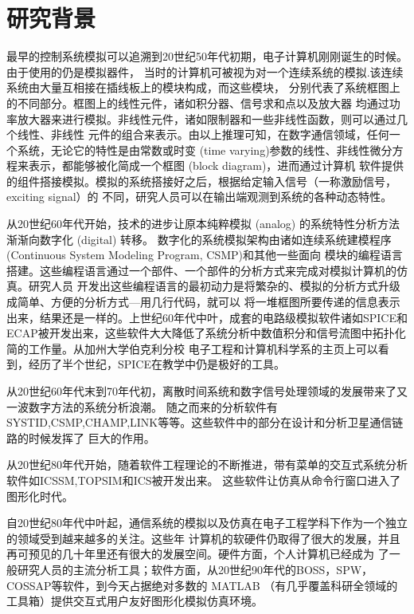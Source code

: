 \section{研究背景}\label{ResearchBackground}
最早的控制系统模拟可以追溯到20世纪50年代初期，电子计算机刚刚诞生的时候。由于使用的仍是模拟器件，
当时的计算机可被视为对一个连续系统的模拟.该连续系统由大量互相接在插线板上的模块构成，而这些模块，
分别代表了系统框图上的不同部分。框图上的线性元件，诸如积分器、信号求和点以及放大器
均通过功率放大器来进行模拟。非线性元件，诸如限制器和一些非线性函数，则可以通过几个线性、非线性
元件的组合来表示。由以上推理可知，在数字通信领域，任何一个系统，无论它的特性是由常数或时变 (time
varying)参数的线性、非线性微分方程来表示，都能够被化简成一个框图 (block diagram)，进而通过计算机
软件提供的组件搭接模拟。模拟的系统搭接好之后，根据给定输入信号（一称激励信号，exciting signal）的
不同，研究人员可以在输出端观测到系统的各种动态特性。
\par
从20世纪60年代开始，技术的进步让原本纯粹模拟 (analog) 的系统特性分析方法渐渐向数字化 (digital) 转移。
数字化的系统模拟架构由诸如连续系统建模程序 (Continuous System Modeling Program, CSMP)和其他一些面向
模块的编程语言搭建。这些编程语言通过一个部件、一个部件的分析方式来完成对模拟计算机的仿真。研究人员
开发出这些编程语言的最初动力是将繁杂的、模拟的分析方式升级成简单、方便的分析方式---用几行代码，就可以
将一堆框图所要传递的信息表示出来，结果还是一样的。上世纪60年代中叶，成套的电路级模拟软件诸如SPICE和
ECAP被开发出来，这些软件大大降低了系统分析中数值积分和信号流图中拓扑化简的工作量。从加州大学伯克利分校
电子工程和计算机科学系的主页上可以看到，经历了半个世纪，SPICE在教学中仍是极好的工具。
\par
从20世纪60年代末到70年代初，离散时间系统和数字信号处理领域的发展带来了又一波数字方法的系统分析浪潮。
随之而来的分析软件有SYSTID,CSMP,CHAMP,LINK等等。这些软件中的部分在设计和分析卫星通信链路的时候发挥了
巨大的作用。
\par
从20世纪80年代开始，随着软件工程理论的不断推进，带有菜单的交互式系统分析软件如ICSSM,TOPSIM和ICS被开发出来。
这些软件让仿真从命令行窗口进入了图形化时代。
\par
自20世纪80年代中叶起，通信系统的模拟以及仿真在电子工程学科下作为一个独立的领域受到越来越多的关注。这些年
计算机的软硬件仍取得了很大的发展，并且再可预见的几十年里还有很大的发展空间。硬件方面，个人计算机已经成为
了一般研究人员的主流分析工具；软件方面，从20世纪90年代的BOSS，SPW，COSSAP等软件，到今天占据绝对多数的
MATLAB （有几乎覆盖科研全领域的工具箱）\label{MATLABandItsToolbox}提供交互式用户友好图形化模拟仿真环境。
